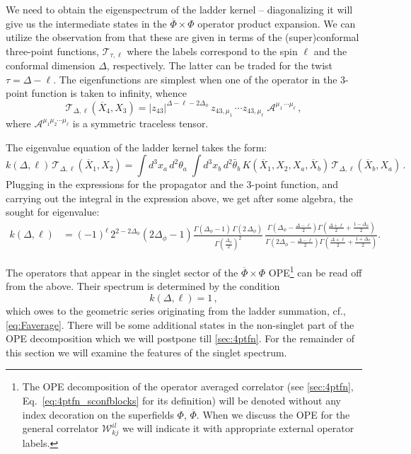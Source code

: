 \documentclass[11pt]{article}
\newcommand{\thetab}{\bar{\theta}}
\newcommand{\Phib}{\overline{\Phi}}
\newcommand{\Xb}{\overline{X}}
\begin{document}
We need to obtain the eigenspectrum of the ladder kernel -- diagonalizing it will give us the intermediate states in the $\Phib \times\Phi$ operator product expansion. We can utilize the observation from \cite{Maldacena:2016hyu} that these are given in terms of the (super)conformal three-point functions, $\mathcal{T}_{\tau, \ell}$ where the labels correspond to the spin $\ell$ and the conformal dimension $\Delta$, respectively. The latter can be traded for the twist $\tau = \Delta - \ell$. The eigenfunctions are simplest when one of the operator in the 3-point function is taken to infinity, whence 
%
\begin{equation}
\mathcal{T}_{\Delta, \ell}(\Xb_4, X_3) = |z_{43}|^{\Delta -\ell -2 \Delta_\phi} \, z_{43, \mu_1} \, \cdots z_{43, \mu_\ell} \; \mathcal{A}^{\mu_1\, \cdots \mu_\ell}\,,
\end{equation}	
%
where $\mathcal{A}^{\mu_1 \mu_2 \cdots \mu_\ell}$ is a symmetric traceless tensor.  

The eigenvalue equation of the ladder kernel takes the form:
%
\begin{equation}\label{eq:kernelDl}
k(\Delta, \ell)\, \mathcal{T}_{\Delta , \ell}(\Xb_1,X_2) = \int d^3 x_a\, d^2\theta_a\;  \int  d^3x_b\, d^2\thetab_b \, K(\Xb_1, X_2, X_a, \Xb_b) \, \mathcal{T}_{\Delta ,\ell} (\Xb_b,X_a) \,.
\end{equation}	
%
Plugging in the expressions for the propagator and the 3-point function, and carrying out the integral in the expression above, we get after some algebra, the sought for eigenvalue:
%
\begin{equation}\label{eq:ksheqn}
\begin{split}
k(\Delta, \ell)
&= 
	(-1)^{\ell}\, 2^{2-2\Delta_\phi}(2\Delta_\phi-1)
		\frac{\Gamma(\Delta_\phi-1)\, \Gamma(2\,\Delta_\phi)}{\Gamma\left(\frac{\Delta_\phi}{2}\right)^2}
		\, \frac{\Gamma\left(\Delta_\phi-\frac{\Delta-\ell}{2}\right)\Gamma\left(\frac{\Delta+\ell}{2}+\frac{1-\Delta_\phi}{2}\right)}{\Gamma\left(2\Delta_\phi-\frac{\Delta-\ell}{2}\right)\Gamma\left(\frac{\Delta+\ell}{2}+\frac{1+\Delta_\phi}{2}\right)}.
\end{split}	
\end{equation}	
%

The operators that  appear in the singlet sector of the $\Phib \times \Phi$ OPE\footnote{The OPE decomposition of the operator averaged correlator (see \cref{sec:4ptfn}, Eq.~\eqref{eq:4ptfn_sconfblocks} for its definition) will be denoted without any index decoration on the superfields $\Phi$, $\Phib$. When we discuss the OPE for the general correlator $\mathcal{W}^{il}_{kj}$ we will indicate it with appropriate external operator labels.}  can be read off from the above. Their spectrum is determined by the condition 
%
\begin{equation}\label{eq:kernev1}
k(\Delta, \ell) =1\,,
\end{equation}	
%
which owes to the geometric series originating from the ladder summation, cf., \eqref{eq:Faverage}. There will be some additional states in the non-singlet part of the OPE decomposition which we will postpone till  \cref{sec:4ptfn}. For the remainder of this section we will examine the features of the singlet spectrum.
\end{document}

